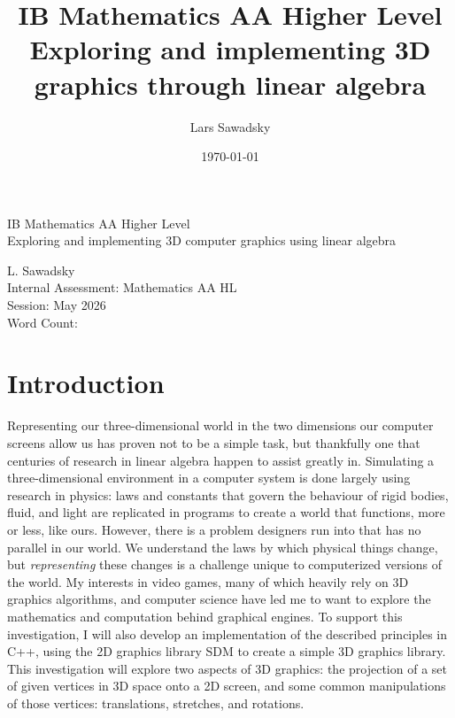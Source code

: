 \documentclass[12pt, a4paper]{article}
\title{ IB Mathematics AA Higher Level\\
    
    Exploring and implementing 3D graphics through linear
algebra }
\author{Lars Sawadsky}
\date{\today}
\begin{document}
    \begin{titlepage}
        \begin{center}
            \vspace*{9cm}

            IB Mathematics AA Higher Level\\
            \medskip
            Exploring and implementing 3D computer graphics
            using linear algebra

            \vspace{8cm}

            L. Sawadsky\\
            Internal Assessment: Mathematics AA HL\\
            Session: May 2026\\
            Word Count:
        \end{center}
        \newpage
    \end{titlepage}

    \tableofcontents
    \newpage

    \section{Introduction}

    Representing our three-dimensional world in the two
    dimensions our computer screens allow us has proven not to
    be a simple task, but thankfully one that centuries of
    research in linear algebra happen to assist greatly in.
    Simulating a three-dimensional environment in a computer
    system is done largely using research in physics: laws and
    constants that govern the behaviour of rigid bodies, fluid,
    and light are replicated in programs to create a world that
    functions, more or less, like ours. However, there is a
    problem designers run into that has no parallel in our
    world. We understand the laws by which physical things
    change, but \textit{representing} these changes is a
    challenge unique to computerized versions of the world. My
    interests in video games, many of which heavily rely on 3D
    graphics algorithms, and computer science have led me to
    want to explore the mathematics and computation behind
    graphical engines. To support this investigation, I will
    also develop an implementation of the described principles
    in C++, using the 2D graphics library SDM to create a simple
    3D graphics library. This investigation will explore two aspects
    of 3D graphics: the projection of a set of given
    vertices in 3D space onto a 2D screen, and some common
    manipulations of those vertices: translations, stretches,
    and rotations. 
\end{document}
